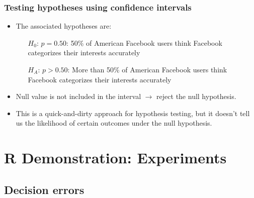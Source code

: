 \documentclass[t,compress,mathserif]{beamer}
\begin{document}

\begin{frame}
\frametitle{Testing hypotheses using confidence intervals}

{\small {}}

\pause

\begin{itemize}

\item The associated hypotheses are:
\begin{itemize}
\item[$H_0$:] $p = 0.50$: 50\% of American Facebook users think Facebook categorizes their interests accurately
\item[$H_A$:] $p > 0.50$: More than 50\% of American Facebook users think Facebook categorizes their interests accurately
\end{itemize}

\pause

\item Null value is not included in the interval $\rightarrow$ reject the null hypothesis.

\pause

\item This is a quick-and-dirty approach for hypothesis testing, but it doesn't tell us the likelihood of certain outcomes under the null hypothesis.

\end{itemize}

\end{frame}


\section{R Demonstration: Experiments}


\subsection{Decision errors}
\end{document}
